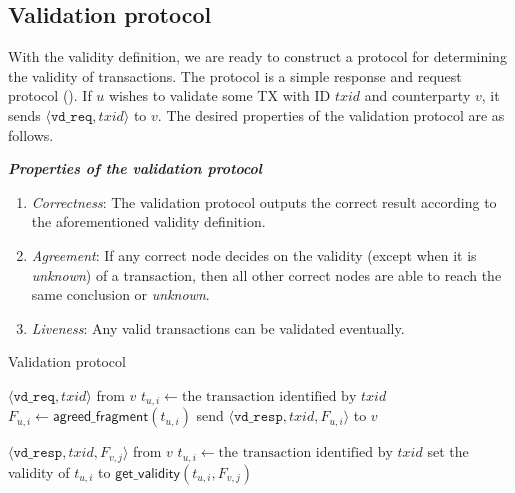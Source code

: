 \subsection{Validation protocol}
With the validity definition, we are ready to construct a protocol for determining the validity of transactions.
The protocol is a simple response and request protocol ().
If $u$ wishes to validate some TX with ID $txid$ and counterparty $v$, it sends $\langle \texttt{vd\_req}, txid \rangle$ to $v$.
The desired properties of the validation protocol are as follows.
\begin{definition}
\label{def:validation}
\textbf{\emph{Properties of the validation protocol}}

\begin{enumerate}
    \item \emph{Correctness}:
        The validation protocol outputs the correct result
        according to the aforementioned validity definition.
    \item \emph{Agreement}:
        If any correct node decides on the validity (except when it is \emph{unknown}) of a transaction,
        then all other correct nodes are able to reach the same conclusion or \emph{unknown}.
    \item \emph{Liveness}:
        Any valid transactions can be validated eventually.
\end{enumerate}
\end{definition}

\begin{algorithm}
\caption{Validation protocol}
\label{alg:vd-proto}

\begin{algorithmic}
    \Upon $\langle \texttt{vd\_req}, txid \rangle$ from $v$
        \State $t_{u, i} \gets \text{the transaction identified by } txid$
        \State $F_{u, i} \gets \textsf{agreed\_fragment}(t_{u, i})$
        \State send $\langle \texttt{vd\_resp}, txid, F_{u, i} \rangle$ to $v$

    \Upon $\langle \texttt{vd\_resp}, txid, F_{v, j} \rangle$ from $v$
        \State $t_{u, i} \gets \text{the transaction identified by } txid$
        \State set the validity of $t_{u, i}$ to $\textsf{get\_validity}(t_{u, i}, F_{v, j})$
\end{algorithmic}
\end{algorithm}

